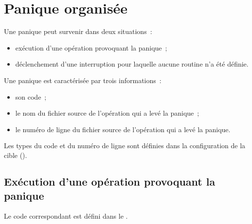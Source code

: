 




\chapter{Panique organisée}


Une panique peut survenir dans deux situations~:
\begin{itemize}
  \item exécution d'une opération provoquant la panique~;
  \item déclenchement d'une interruption pour laquelle aucune routine n'a été définie.
\end{itemize}


Une panique est caractérisée par trois informations~:
\begin{itemize}
  \item son code~;
  \item le nom du fichier source de l'opération qui a levé la panique~;
  \item le numéro de ligne du fichier source de l'opération qui a levé la panique.
\end{itemize}

Les types du code et du numéro de ligne sont définies dans la configuration de la cible ().







\section{Exécution d'une opération provoquant la panique}

Le code correspondant est défini dans le .


